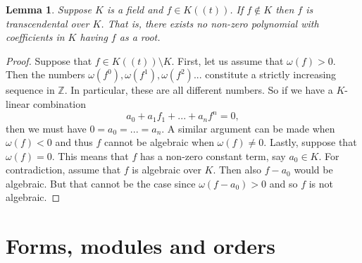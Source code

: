 \documentclass{article}
\newtheorem{lemma}{Lemma}[section]
\newcommand{\mbb}[1]{\mathbb{#1}}
\numberwithin{equation}{section}
\begin{document}
\begin{lemma}\label{lem: Unit power series is transcendental}
    Suppose $K$ is a field and $f \in K((t))$. If $f \notin K$ then $f$ is transcendental over $K$. That is, there exists no non-zero polynomial with coefficients in $K$ having $f$ as a root.
\end{lemma}
\begin{proof}
    Suppose that $f \in K((t)) \setminus K$. First, let us assume that $\omega(f) > 0$. Then the numbers $\omega(f^0), \omega(f^1),\omega(f^2) ...$ constitute a strictly increasing sequence in $\mbb Z$. In particular, these are all different numbers. So if we have a $K$-linear combination
    $$a_0 + a_1 f_1 + ... + a_nf^n = 0,$$
    then we must have $0 = a_0 = ... = a_n$. A similar argument can be made when $\omega(f) < 0$ and thus $f$ cannot be algebraic when $\omega(f) \neq 0$. Lastly, suppose that $\omega(f) = 0$. This means that $f$ has a non-zero constant term, say $a_0 \in K$. For contradiction, assume that $f$ is algebraic over $K$. Then also $f - a_0$ would be algebraic. But that cannot be the case since $\omega(f - a_0) > 0$ and so $f$ is not algebraic.
\end{proof}



\section{Forms, modules and orders}\label{sec: Forms and modules}
\end{document}
